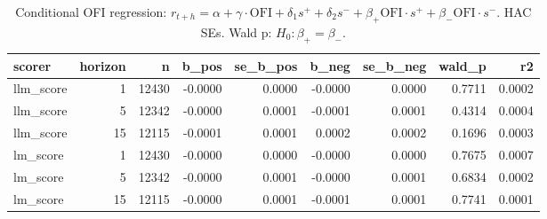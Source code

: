 \begin{table}[htbp]
\centering
\caption{Conditional OFI regression: $r_{t+h}=\alpha+\gamma\cdot\text{OFI}+\delta_1 s^++\delta_2 s^-+\beta_+\text{OFI}\cdot s^++\beta_-\text{OFI}\cdot s^-$. HAC SEs. Wald p: $H_0:\beta_+=\beta_-$.}
\label{tab:conditional_ofi}
\begin{tabular}{lrrrrrrrr}
\toprule
scorer & horizon & n & b\_pos & se\_b\_pos & b\_neg & se\_b\_neg & wald\_p & r2 \\
\midrule
llm\_score & 1 & 12430 & -0.0000 & 0.0000 & -0.0000 & 0.0000 & 0.7711 & 0.0002 \\
llm\_score & 5 & 12342 & -0.0000 & 0.0001 & -0.0001 & 0.0001 & 0.4314 & 0.0004 \\
llm\_score & 15 & 12115 & -0.0001 & 0.0001 & 0.0002 & 0.0002 & 0.1696 & 0.0003 \\
lm\_score & 1 & 12430 & -0.0000 & 0.0000 & -0.0000 & 0.0000 & 0.7675 & 0.0007 \\
lm\_score & 5 & 12342 & -0.0000 & 0.0001 & -0.0000 & 0.0001 & 0.6834 & 0.0002 \\
lm\_score & 15 & 12115 & -0.0000 & 0.0001 & -0.0001 & 0.0001 & 0.7741 & 0.0001 \\
\bottomrule
\end{tabular}
\end{table}
